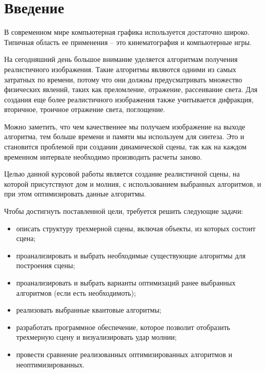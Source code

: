 \chapter*{Введение}

В современном мире компьютерная графика используется достаточно широко. Типичная область ее применения – это кинематография и компьютерные игры.

На сегодняшний день большое внимание уделяется алгоритмам получения реалистичного изображения. Такие алгоритмы являются одними из самых затратных по времени, потому что они должны предусматривать множество физических явлений, таких как преломление, отражение, рассеивание света. Для создания еще более реалистичного изображения также учитывается дифракция, вторичное, троичное отражение света, поглощение. 

Можно заметить, что чем качественнее мы получаем изображение на выходе алгоритма, тем больше времени и памяти мы используем для синтеза. Это и становится проблемой при создании динамической сцены, так как на каждом временном интервале необходимо производить расчеты заново. 

Целью данной курсовой работы является создание реалистичной сцены, на которой присутствуют дом и молния, с использованием выбранных алгоритмов, и при этом оптимизировать данные алгоритмы.

Чтобы достигнуть поставленной цели, требуется решить следующие задачи:

\begin{itemize}
	\item описать структуру трехмерной сцены, включая объекты, из которых состоит сцена;
    \item проанализировать и выбрать необходимые существующие алгоритмы для построения сцены;
    \item проанализировать и выбрать варианты оптимизаций ранее выбранных алгоритмов (если есть необходимоть);
    \item реализовать выбранные квантовые алгоритмы;
    \item разработать программное обеспечение, которое позволит отобразить трехмерную сцену и визуализировать удар молнии;
    \item провести сравнение реализованных оптимизированных алгоритмов и неоптимизированных.
\end{itemize}
